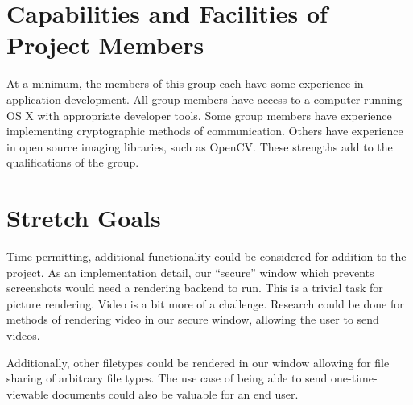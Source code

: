 \documentclass{article}
\begin{document}
\section{Capabilities and Facilities of Project Members}
At a minimum, the members of this group each have some experience in application development. All group members have access to a computer running OS X with appropriate developer tools. Some group members have experience implementing cryptographic methods of communication. Others have experience in open source imaging libraries, such as OpenCV. These strengths add to the qualifications of the group.

\section{Stretch Goals}
Time permitting, additional functionality could be considered for addition to the project. As an implementation detail, our ``secure'' window which prevents screenshots would need a rendering backend to run. This is a trivial task for picture rendering. Video is a bit more of a challenge. Research could be done for methods of rendering video in our secure window, allowing the user to send videos.

Additionally, other filetypes could be rendered in our window allowing for file sharing of arbitrary file types. The use case of being able to send one-time-viewable documents could also be valuable for an end user.
\end{document}
